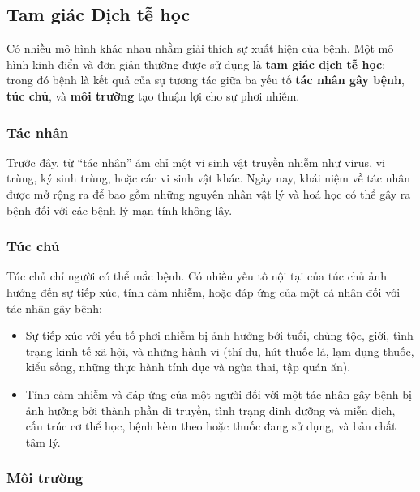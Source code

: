 \documentclass[
]{book}
\begin{document}
\hypertarget{tam-giuxe1c-dux1ecbch-tux1ec5-hux1ecdc}{%
\subsection{Tam giác Dịch tễ học}\label{tam-giuxe1c-dux1ecbch-tux1ec5-hux1ecdc}}

Có nhiều mô hình khác nhau nhằm giải thích sự xuất hiện của bệnh. Một mô hình kinh điển và đơn giản thường được sử dụng là \textbf{tam giác dịch tễ học}; trong đó bệnh là kết quả của sự tương tác giữa ba yếu tố \textbf{tác nhân gây bệnh}, \textbf{túc chủ}, và \textbf{môi trường} tạo thuận lợi cho sự phơi nhiễm.

\hypertarget{tuxe1c-nhuxe2n}{%
\subsubsection{Tác nhân}\label{tuxe1c-nhuxe2n}}

Trước đây, từ ``tác nhân'' ám chỉ một vi sinh vật truyền nhiễm như virus, vi trùng, ký sinh trùng, hoặc các vi sinh vật khác. Ngày nay, khái niệm về tác nhân được mở rộng ra để bao gồm những nguyên nhân vật lý và hoá học có thể gây ra bệnh đối với các bệnh lý mạn tính không lây.

\hypertarget{tuxfac-chux1ee7}{%
\subsubsection{Túc chủ}\label{tuxfac-chux1ee7}}

Túc chủ chỉ người có thể mắc bệnh. Có nhiều yếu tố nội tại của túc chủ ảnh hưởng đến sự tiếp xúc, tính cảm nhiễm, hoặc đáp ứng của một cá nhân đối với tác nhân gây bệnh:

\begin{itemize}
\item
  Sự tiếp xúc với yếu tố phơi nhiễm bị ảnh hưởng bởi tuổi, chủng tộc, giới, tình trạng kinh tế xã hội, và những hành vi (thí dụ, hút thuốc lá, lạm dụng thuốc, kiểu sống, những thực hành tính dục và ngừa thai, tập quán ăn).
\item
  Tính cảm nhiễm và đáp ứng của một người đối với một tác nhân gây bệnh bị ảnh hưởng bởi thành phần di truyền, tình trạng dinh dưỡng và miễn dịch, cấu trúc cơ thể học, bệnh kèm theo hoặc thuốc đang sử dụng, và bản chất tâm lý.
\end{itemize}

\hypertarget{muxf4i-trux1b0ux1eddng}{%
\subsubsection{Môi trường}\label{muxf4i-trux1b0ux1eddng}}
\end{document}
